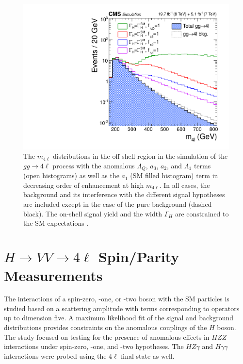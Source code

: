 \begin{figure}
\begin{center}
\centerline{
\includegraphics[width=0.45\linewidth]{Conclusion/cCanvas_MCFMBSM_GenLevel.pdf}
}
\caption[The $m_{4\ell}$ distributions in the off-shell region in the simulation of the $gg \to 4\ell$ process with the 
anomalous $\Lambda_{Q}$, $a_3$, $a_2$, and $\Lambda_{1}$ terms (open histograms) as well as the $a_1$  (SM filled histogram) term in decreasing order of enhancement at high $m_{4\ell}$.
In all cases, the background and its interference with the different signal hypotheses are included except in the case of the pure background (dashed black). The on-shell signal yield and the width $\Gamma_{H}$ are constrained to the SM expectations.]{ The $m_{4\ell}$ distributions in the off-shell region in the simulation of the $gg \to 4\ell$ process with the 
anomalous $\Lambda_{Q}$, $a_3$, $a_2$, and $\Lambda_{1}$ terms (open histograms) as well as the $a_1$  (SM filled histogram) term in decreasing order of enhancement at high $m_{4\ell}$.
In all cases, the background and its interference with the different signal hypotheses are included except in the case of the pure background (dashed black). The on-shell signal yield and the width $\Gamma_{H}$ are constrained to the SM expectations \cite{CMS_AN_2014_247}.
}
\label{fig:reweight_m4l_offshell}
\end{center}
\end{figure}


\section{\texorpdfstring{$H \to VV \to 4\ell$}{H to VV to 4l} Spin/Parity Measurements}
\label{sec:Summary_SpinParity}

The interactions of a spin-zero, -one, or -two boson with
the SM particles is studied based on a scattering amplitude with terms corresponding to operators up to dimension five. A maximum likelihood fit of the signal and background distributions provides constraints on the anomalous couplings of the $H$ boson. The study focused on testing for the presence of anomalous effects in $HZZ$ interactions under spin-zero, -one, and -two hypotheses. The $HZ\gamma$ and $H\gamma\gamma$  interactions were probed using the $4\ell$ final state as well.


